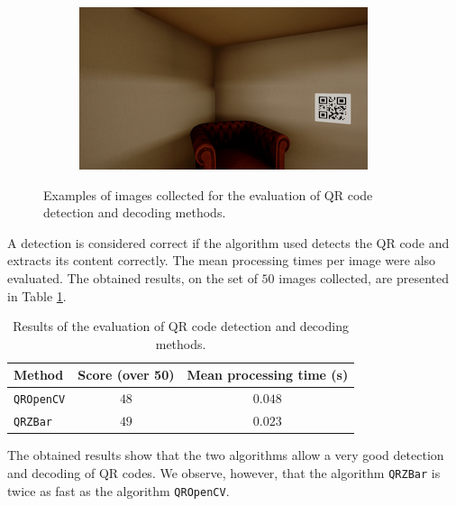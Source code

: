 \begin{figure}[H]
\begin{subfigure}{0.32\textwidth}
    \end{subfigure}
    \hfill
    \begin{subfigure}{0.32\textwidth}
        \centering
        \includegraphics[width=\textwidth]{resources/png/06/markers/qr/5.png}
    \end{subfigure}
    \caption{Examples of images collected for the evaluation of QR code detection and decoding methods.}
    \label{fig:06.markers.qr.examples}
\end{figure}

A detection is considered correct if the algorithm used detects the QR code and extracts its content correctly. The mean processing times per image were also evaluated. The obtained results, on the set of $\num{50}$ images collected, are presented in Table \ref{tab:06.markers.qr.evaluation}.

\begin{table}[H]
    \centering
    \begin{tabular}{|l|c|c|}
        \hline
        \textbf{Method} & \textbf{Score} (over 50) & \textbf{Mean processing time} (s) \\ \hline
        \hline
        \texttt{QROpenCV} & $\num{48}$ & $\num{0.048}$ \\ \hline
        \texttt{QRZBar} & $\num{49}$ & $\num{0.023}$ \\ \hline
    \end{tabular}
    \caption{Results of the evaluation of QR code detection and decoding methods.}
    \label{tab:06.markers.qr.evaluation}
\end{table}

The obtained results show that the two algorithms allow a very good detection and decoding of QR codes. We observe, however, that the algorithm \texttt{QRZBar} is twice as fast as the algorithm \texttt{QROpenCV}.

